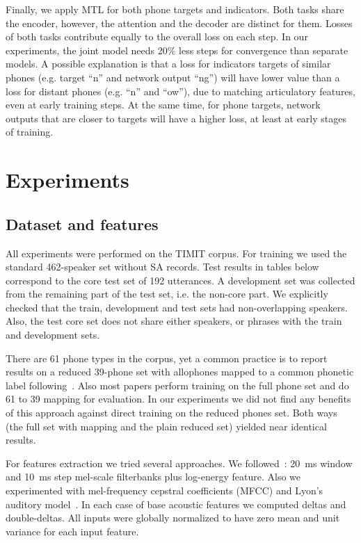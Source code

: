 \documentclass[a4paper]{article}
\begin{document}
Finally, we apply MTL for both phone targets and indicators. Both tasks share the encoder, however, the attention and the decoder are distinct for them. Losses of both tasks contribute equally to the overall loss on each step. In our experiments, the joint model needs 20\% less steps for convergence than separate models. A possible explanation is that a loss for indicators targets of similar phones (e.g. target ``n'' and network output ``ng'') will have lower value than a loss for distant phones (e.g. ``n'' and ``ow''), due to matching articulatory features, even at early training steps. At the same time, for phone targets, network outputs that are closer to targets will have a higher loss, at least at early stages of training.

\section{Experiments}
\subsection{Dataset and features}
All experiments were performed on the TIMIT corpus. For training we used the standard 462-speaker set without SA records. Test results in tables below correspond to the core test set of 192 utterances. A development set was collected from the remaining part of the test set, i.e. the non-core part. We explicitly checked that the train, development and test sets had non-overlapping speakers. Also, the test core set does not share either speakers, or phrases with the train and development sets.

There are 61 phone types in the corpus, yet a common practice is to report results on a reduced 39-phone set with allophones mapped to a common phonetic label following~\cite{Lee-1989}. Also most papers perform training on the full phone set and do 61 to 39 mapping for evaluation. In our experiments we did not find any benefits of this approach against direct training on the reduced phones set. Both ways (the full set with mapping and the plain reduced set) yielded near identical results.

For features extraction we tried several approaches. We followed~\cite{Graves2013}: 20~ms window and 10~ms step mel-scale filterbanks plus log-energy feature. Also we experimented with mel-frequency cepstral coefficients (MFCC) and Lyon's auditory model~\cite{Lyon-1982}. In each case of base acoustic features we computed deltas and double-deltas. All inputs were globally normalized to have zero mean and unit variance for each input feature.
\end{document}
